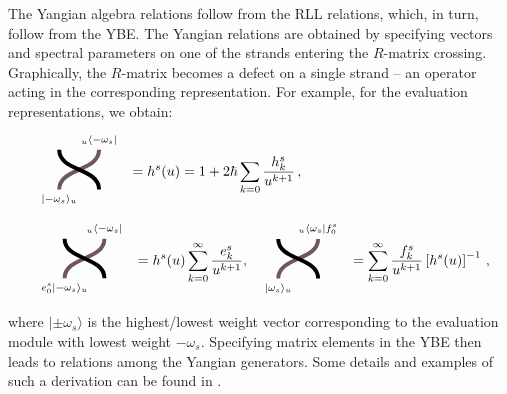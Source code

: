 \documentclass[10pt]{article}
\theoremstyle{definition}
\def\lm{\limits}
\numberwithin{equation}{section}
\begin{document}
The Yangian algebra relations follow from the RLL relations, which, in turn, follow from the YBE.
The Yangian relations are obtained by specifying vectors and spectral parameters on one of the strands entering the $R$-matrix crossing.
Graphically, the $R$-matrix becomes a defect on a single strand -- an operator acting in the corresponding representation.
For example, for the evaluation representations, we obtain:
\begin{equation}
	\begin{aligned}
	&\begin{array}{c}
		\begin{tikzpicture}
			\draw[color1, line width =1mm] (-0.5,-0.5) to[out=90,in=270] (0.5,0.5);
			\draw[line width =1mm]  (0.5,-0.5) to[out=90,in=270] (-0.5,0.5);
			\node[below] at (-0.5,-0.5) {$\scriptstyle |-\omega_s\rangle_u$};
			\node[above] at (0.5,0.5) {$\scriptstyle {}_u\langle-\omega_s|$};
		\end{tikzpicture}
	\end{array}=h^s(u)=1+2\hbar\sum\lm_{k=0}\frac{h_k^s}{u^{k+1}}\,,\\
	& \begin{array}{c}
	\begin{tikzpicture}
		\draw[color1, line width =1mm] (-0.5,-0.5) to[out=90,in=270] (0.5,0.5);
		\draw[line width =1mm]  (0.5,-0.5) to[out=90,in=270] (-0.5,0.5);
		\node[below] at (-0.5,-0.5) {$\scriptstyle e_0^s |-\omega_s\rangle_u$};
		\node[above] at (0.5,0.5) {$\scriptstyle {}_u\langle-\omega_s|$};
	\end{tikzpicture}
	\end{array}=h^s(u)\sum\lm_{k=0}^{\infty}\frac{e_k^s}{u^{k+1}},\; \begin{array}{c}
	\begin{tikzpicture}
		\draw[color1, line width =1mm] (-0.5,-0.5) to[out=90,in=270] (0.5,0.5);
		\draw[line width =1mm]  (0.5,-0.5) to[out=90,in=270] (-0.5,0.5);
		\node[below] at (-0.5,-0.5) {$\scriptstyle |\omega_s\rangle_u$};
		\node[above] at (0.5,0.5) {$\scriptstyle {}_u\langle\omega_s|f_0^s $};
	\end{tikzpicture}
	\end{array}=\sum\lm_{k=0}^{\infty}\frac{f_k^s}{u^{k+1}}\left[h^s(u)\right]^{-1}\,,
	\end{aligned}
\end{equation}
where $|\pm \omega_s\rangle$ is the highest/lowest weight vector corresponding to the evaluation module with lowest weight $-\omega_s$.
Specifying matrix elements in the YBE then leads to relations among the Yangian generators.
Some details and examples of such a derivation can be found in \cite[App.~B]{Litvinov:2020zeq}.
\end{document}
